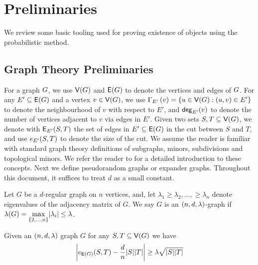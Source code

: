 \documentclass[11pt]{article}
\begin{document}
\section{Preliminaries}
\label{sec:prelims}

We review some basic tooling used for proving existence of objects using the probabilistic method.




\subsection{Graph Theory Preliminaries}
\label{sec:graph-theory-prelims}
For a graph $\Graph$, we use $\Vertices{\Graph}$ and $\Edges{\Graph}$ to denote the vertices and edges of $\Graph$.
For any $E' \subseteq \Edges{\Graph}$ and a vertex $v \in \Vertices{\Graph}$, we use $\Neighbourhood{E'}{v} = \{ u \in \Vertices{\Graph} : (u,v) \in E' \}$ to denote the neighbourhood of $v$ with respect to $E'$, and $\degree{E'}{v}$ to denote the number of vertices adjacent to $v$ via edges in $E'$.
Given two sets $S, T \subseteq \Vertices{G}$, we denote with $\CutEdgesSet{S}{T}{E'}$ the set of edges in $E' \subseteq \Edges{G}$ in the cut between $S$ and $T$, and use $\CutEdges{S}{T}{E'}$ to denote the size of the cut.
We assume the reader is familiar with standard graph theory definitions of subgraphs, minors, subdivisions and  topological minors.
We refer the reader to \citep{bollobas2012graph} for a detailed introduction to these concepts.
Next we define pseudorandom graphs or expander graphs.
Throughout this document, it suffices to treat $d$ as a small constant.

\begin{definition}\label{def:expander-graphs}
Let $G$ be a $d$-regular graph on $n$ vertices, and, let $\lambda_1 \geq \lambda_2, \dots, \geq \lambda_n$ denote eigenvalues of the adjacency matrix of $G$.
We say $G$ is an $\EnDeeLambda$-graph if $\ExpansionFactor{\Graph} \Def \underset{{\{2, \dots, n\}}}{\max}|\lambda_i| \leq \lambda$.
\end{definition}


\begin{lemma}\label{lemma:expanders-mixing-lemma}
  Given an $\EnDeeLambda$ graph $G$ for any $S, T \subseteq \Vertices{G}$ we have
$$
  \left| \CutEdges{S}{T}{\Edges{G}} - \frac{d}{n}|S||T| \right|
  \geq \lambda\sqrt{\Size{S}\Size{T} }
$$
\end{lemma}
\end{document}
